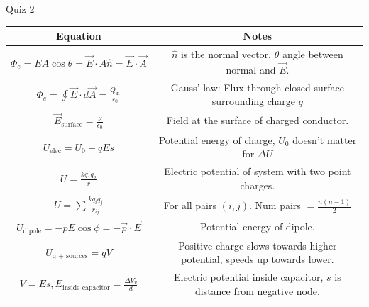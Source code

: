 \documentclass{article}
\newcommand{\eps}{\epsilon_0}
\begin{document}
\begin{section}{Quiz 2}
 \begin{tabular}{|c|c|}
	 \hline Equation                                                                              & Notes                                                                      \\
	 \hline $\Phi_e = E A \cos \theta = \vec E \cdot A \hat n = \vec E \cdot \vec A$              & $\hat n$ is the normal vector, $\theta$ angle between normal and $\vec E$. \\


	 $\Phi_e = \oint \vec E \cdot d \vec A = \frac{Q_\text{in}}{\epsilon_0}$                      & Gauss' law: Flux through closed surface surrounding charge $q$             \\

	 $\vec E_\text{surface} = \frac{\nu}{\eps}$                                                   & Field at the surface of charged conductor.                                 \\

	 $U_\text{elec} = U_0 + qEs$                                                                  & Potential energy of charge, $U_0$ doesn't matter for $\Delta U$            \\

	 $U = \frac{k q_1 q_2}{r}$                                                                    & Electric potential of system with two point charges.                       \\

	 $U = \sum \frac{k q_i q_j}{r_{ij}}$                                                          & For all pairs $(i,j)$. Num pairs $= \frac{n(n-1)}{2}$                      \\

	 $U_\text{dipole} = - p E \cos \phi = - \vec p \cdot \vec E$                                  & Potential energy of dipole.                                                \\

	 $U_\text{q + sources} = qV$                                                                  & Positive charge slows towards higher potential, speeds up towards lower.   \\

	 $V = Es, E_\text{inside capacitor} = \frac{\Delta V_v}{d}$                                   & Electric potential inside capacitor, $s$ is distance from negative node.   \\


\end{tabular}
\end{section}
\end{document}
